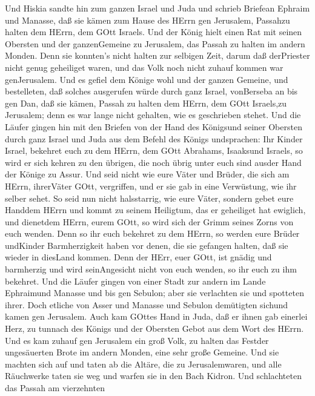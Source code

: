  Und Hiskia sandte hin zum ganzen Israel und Juda und
schrieb Briefean Ephraim und Manasse, daß sie kämen zum Hause des HErrn
gen Jerusalem, Passahzu halten dem HErrn, dem GOtt Israels. 
Und der König hielt einen Rat mit seinen Obersten und der ganzenGemeine
zu Jerusalem, das Passah zu halten im andern Monden.  Denn
sie konnten's nicht halten zur selbigen Zeit, darum daß derPriester
nicht genug geheiliget waren, und das Volk noch nicht zuhauf kommen war
genJerusalem.  Und es gefiel dem Könige wohl und der ganzen
Gemeine,  und bestelleten, daß solches ausgerufen würde
durch ganz Israel, vonBerseba an bis gen Dan, daß sie kämen, Passah zu
halten dem HErrn, dem GOtt Israels,zu Jerusalem; denn es war lange nicht
gehalten, wie es geschrieben stehet.  Und die Läufer gingen
hin mit den Briefen von der Hand des Königsund seiner Obersten durch
ganz Israel und Juda aus dem Befehl des Königs undsprachen: Ihr Kinder
Israel, bekehret euch zu dem HErrn, dem GOtt Abrahams, Isaaksund
Israels, so wird er sich kehren zu den übrigen, die noch übrig unter
euch sind ausder Hand der Könige zu Assur.  Und seid nicht
wie eure Väter und Brüder, die sich am HErrn, ihrerVäter GOtt,
vergriffen, und er sie gab in eine Verwüstung, wie ihr selber sehet.
 So seid nun nicht halsstarrig, wie eure Väter, sondern
gebet eure Handdem HErrn und kommt zu seinem Heiligtum, das er
geheiliget hat ewiglich, und dienetdem HErrn, eurem GOtt, so wird sich
der Grimm seines Zorns von euch wenden.  Denn so ihr euch
bekehret zu dem HErrn, so werden eure Brüder undKinder Barmherzigkeit
haben vor denen, die sie gefangen halten, daß sie wieder in diesLand
kommen. Denn der HErr, euer GOtt, ist gnädig und barmherzig und wird
seinAngesicht nicht von euch wenden, so ihr euch zu ihm bekehret.
 Und die Läufer gingen von einer Stadt zur andern im Lande
Ephraimund Manasse und bis gen Sebulon; aber sie verlachten sie und
spotteten ihrer.  Doch etliche von Asser und Manasse und
Sebulon demütigten sichund kamen gen Jerusalem.  Auch kam
GOttes Hand in Juda, daß er ihnen gab einerlei Herz, zu tunnach des
Königs und der Obersten Gebot aus dem Wort des HErrn.  Und
es kam zuhauf gen Jerusalem ein groß Volk, zu halten das Festder
ungesäuerten Brote im andern Monden, eine sehr große Gemeine.
 Und sie machten sich auf und taten ab die Altäre, die zu
Jerusalemwaren, und alle Räuchwerke taten sie weg und warfen sie in den
Bach Kidron.  Und schlachteten das Passah am vierzehnten
